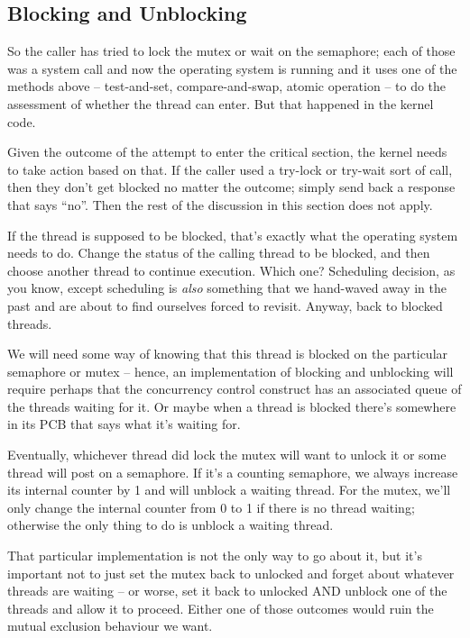 \subsection*{Blocking and Unblocking}

So the caller has tried to lock the mutex or wait on the semaphore; each of those was a system call and now the operating system is running and it uses one of the methods above -- test-and-set, compare-and-swap, atomic operation -- to do the assessment of whether the thread can enter. But that happened in the kernel code.

Given the outcome of the attempt to enter the critical section, the kernel needs to take action based on that. If the caller used a try-lock or try-wait sort of call, then they don't get blocked no matter the outcome; simply send back a response that says ``no''. Then the rest of the discussion in this section does not apply.

If the thread is supposed to be blocked, that's exactly what the operating system needs to do. Change the status of the calling thread to be blocked, and then choose another thread to continue execution. Which one? Scheduling decision, as you know, except scheduling is \textit{also} something that we hand-waved away in the past and are about to find ourselves forced to revisit. Anyway, back to blocked threads.

We will need some way of knowing that this thread is blocked on the particular semaphore or mutex -- hence, an implementation of blocking and unblocking will require perhaps that the concurrency control construct has an associated queue of the threads waiting for it. Or maybe when a thread is blocked there's somewhere in its PCB that says what it's waiting for. 

Eventually, whichever thread did lock the mutex will want to unlock it or some thread will post on a semaphore. If it's a counting semaphore, we always increase its internal counter by 1 and will unblock a waiting thread. For the mutex, we'll only change the internal counter from 0 to 1 if there is no thread waiting; otherwise the only thing to do is unblock a waiting thread.

That particular implementation is not the only way to go about it, but it's important not to just set the mutex back to unlocked and forget about whatever threads are waiting -- or worse, set it back to unlocked AND unblock one of the threads and allow it to proceed. Either one of those outcomes would ruin the mutual exclusion behaviour we want.

